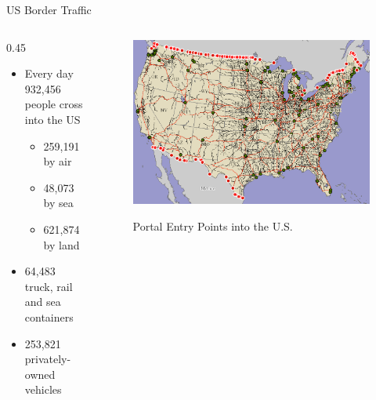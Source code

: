 \documentclass{beamer}
\begin{document}
\begin{frame}{US Border Traffic}
\begin{columns}[onlytextwidth]
\begin{column} {0.45\textwidth}
 
  \begin{itemize}
  \item Every day 932,456 people cross into the US \cite{cpb_typical_2012}
    \begin{itemize}
    	\item 259,191 by air
	\item 48,073 by sea
	\item 621,874 by land
    \end{itemize}
  \item 64,483 truck, rail and sea containers \cite{cpb_typical_2012}
 \item 253,821 privately-owned vehicles \cite{cpb_typical_2012}
  \end{itemize}
\end{column}
\begin{column}{0.45\textwidth}
\centering
\begin{figure}
		\includegraphics[width=\textwidth]{images/PortalEntryMap.eps}
		\label{fig:PortalEntryMap}
	\caption{Portal Entry Points into the U.S.}
\end{figure}
\end{column}
\end{columns}
\end{frame}
\end{document}
